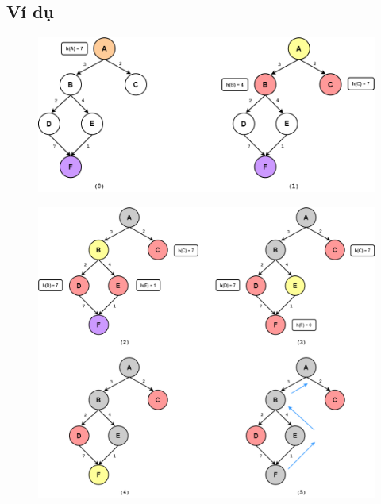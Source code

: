 \subsection{Ví dụ}
\begin{figure}[H]
    \centering
    \includegraphics[scale=0.5]{pic/Greedy1.png}
    \label{fig:my_label}
\end{figure}
\begin{figure}[H]
    \centering
    \includegraphics[scale=0.5]{pic/Greedy2.png}
    \label{fig:my_label}
\end{figure}
